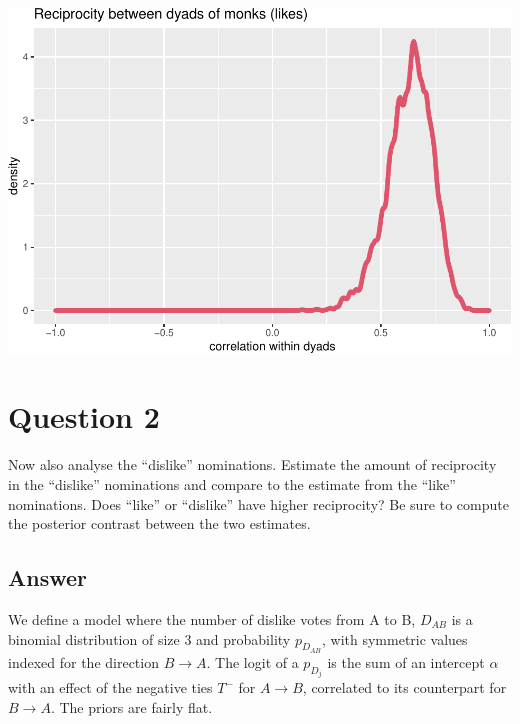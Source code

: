 \documentclass[
]{article}
\begin{document}
\begin{center}\includegraphics{Geraldes-week08_files/figure-latex/unnamed-chunk-7-1} \end{center}

\hypertarget{question-2}{%
\section{Question 2}\label{question-2}}

Now also analyse the ``dislike'' nominations. Estimate the amount of
reciprocity in the ``dislike'' nominations and compare to the estimate
from the ``like'' nominations. Does ``like'' or ``dislike'' have higher
reciprocity? Be sure to compute the posterior contrast between the two
estimates.

\hypertarget{answer-1}{%
\subsection{Answer}\label{answer-1}}

We define a model where the number of dislike votes from A to B,
\(D_{AB}\) is a binomial distribution of size 3 and probability
\(p_{D_{AB}}\), with symmetric values indexed for the direction
\(B \rightarrow A\). The logit of a \(p_{D_j}\) is the sum of an
intercept \(\alpha\) with an effect of the negative ties \(T^-\) for
\(A \rightarrow B\), correlated to its counterpart for
\(B \rightarrow A\). The priors are fairly flat.
\end{document}
